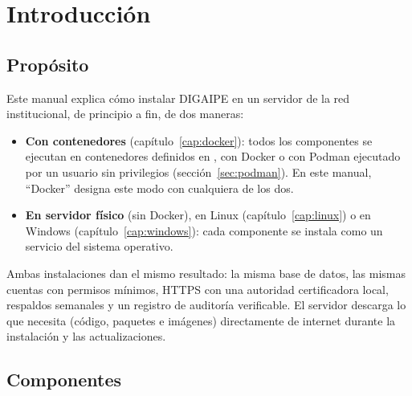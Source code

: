 \chapter{Introducción}

\section{Propósito}

Este manual explica cómo instalar DIGAIPE en un servidor de la red institucional, de principio
a fin, de dos maneras:

\begin{itemize}
	\item \textbf{Con contenedores} (capítulo~\ref{cap:docker}): todos los componentes se
	      ejecutan en contenedores definidos en , con Docker o con Podman
	      ejecutado por un usuario sin privilegios (sección~\ref{sec:podman}). En este manual,
	      ``Docker'' designa este modo con cualquiera de los dos.
	\item \textbf{En servidor físico} (sin Docker), en Linux (capítulo~\ref{cap:linux}) o en
	      Windows (capítulo~\ref{cap:windows}): cada componente se instala como un servicio del
	      sistema operativo.
\end{itemize}

Ambas instalaciones dan el mismo resultado: la misma base de datos, las mismas cuentas con
permisos mínimos, HTTPS con una autoridad certificadora local, respaldos semanales y un registro
de auditoría verificable. El servidor descarga lo que necesita (código, paquetes e imágenes)
directamente de internet durante la instalación y las actualizaciones.

\section{Componentes}

